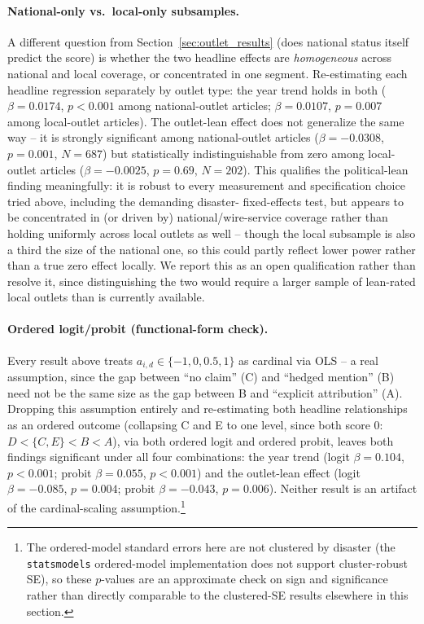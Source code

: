 \documentclass[12pt]{article}
\begin{document}
\paragraph{National-only vs.\ local-only subsamples.} A different question
from Section~\ref{sec:outlet_results} (does national status itself predict
the score) is whether the two headline effects are \emph{homogeneous}
across national and local coverage, or concentrated in one segment.
Re-estimating each headline regression separately by outlet type: the year
trend holds in both ($\beta=0.0174$, $p<0.001$ among national-outlet
articles; $\beta=0.0107$, $p=0.007$ among local-outlet articles). The
outlet-lean effect does not generalize the same way -- it is strongly
significant among national-outlet articles ($\beta=-0.0308$, $p=0.001$,
$N=687$) but statistically indistinguishable from zero among local-outlet
articles ($\beta=-0.0025$, $p=0.69$, $N=202$). This qualifies the
political-lean finding meaningfully: it is robust to every measurement and
specification choice tried above, including the demanding disaster-
fixed-effects test, but appears to be concentrated in (or driven by)
national/wire-service coverage rather than holding uniformly across local
outlets as well -- though the local subsample is also a third the size of
the national one, so this could partly reflect lower power rather than a
true zero effect locally. We report this as an open qualification rather
than resolve it, since distinguishing the two would require a larger
sample of lean-rated local outlets than is currently available.

\begin{sloppypar}
\paragraph{Ordered logit/probit (functional-form check).} Every result
above treats $a_{i,d}\in\{-1,0,0.5,1\}$ as cardinal via OLS -- a real
assumption, since the gap between ``no claim'' (C) and ``hedged mention''
(B) need not be the same size as the gap between B and ``explicit
attribution'' (A). Dropping this assumption entirely and re-estimating
both headline relationships as an ordered outcome (collapsing C and E to
one level, since both score $0$: $D < \{C,E\} < B < A$), via both ordered
logit and ordered probit, leaves both findings significant under all four
combinations: the year trend (logit $\beta=0.104$, $p<0.001$; probit
$\beta=0.055$, $p<0.001$) and the outlet-lean effect (logit
$\beta=-0.085$, $p=0.004$; probit $\beta=-0.043$, $p=0.006$). Neither
result is an artifact of the cardinal-scaling assumption.\footnote{The
ordered-model standard errors here are not clustered by disaster (the
\texttt{statsmodels} ordered-model implementation does not support
cluster-robust SE), so these $p$-values are an approximate check on sign
and significance rather than directly comparable to the clustered-SE
results elsewhere in this section.}
\end{sloppypar}
\end{document}
